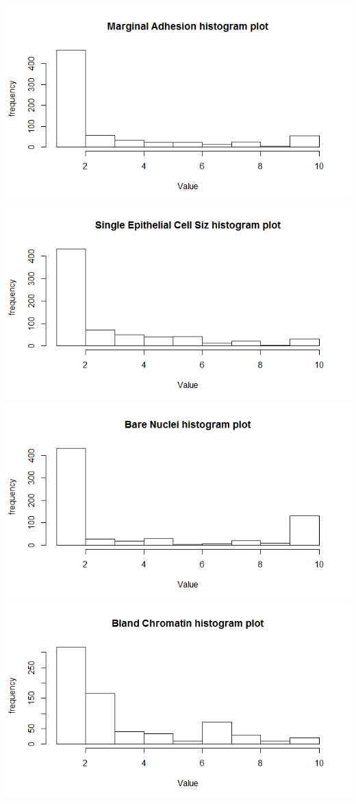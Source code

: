 \documentclass{article}
\begin{document}
\begin{enumerate}
\begin{enumerate}
\includegraphics[width=\textwidth]{marginal.png}
\includegraphics[width=\textwidth]{single.png}
\includegraphics[width=\textwidth]{nuclei.png}
\includegraphics[width=\textwidth]{bland.png}

\end{enumerate}
\end{enumerate}
\end{document}
